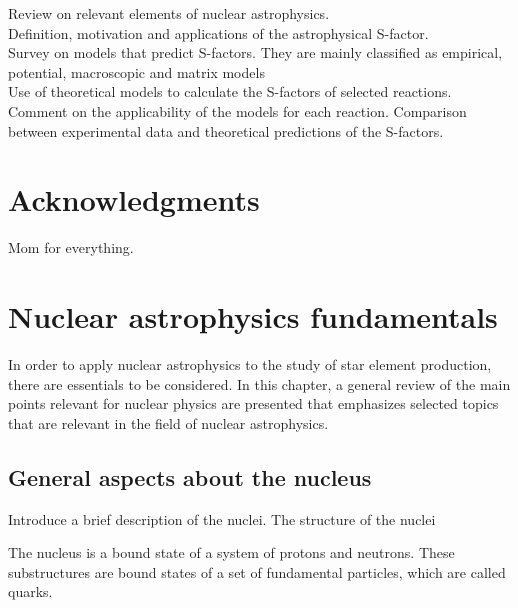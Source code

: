 \documentclass[openany]{book}
\begin{document}
Review on relevant elements of nuclear astrophysics. \\

Definition, motivation and applications of the astrophysical S-factor. \\

Survey on models that predict S-factors. They are mainly classified as empirical, potential, macroscopic and matrix models \\

Use of theoretical models to calculate the S-factors of selected reactions. \\

Comment on the applicability of the models for each reaction. Comparison between experimental data and theoretical predictions of the S-factors.

\clearpage

\chapter*{Acknowledgments}

Mom for everything.

\clearpage

\tableofcontents
\listoffigures
\listoftables



\chapter{Nuclear astrophysics fundamentals}  \label{ch:nuclearAstrophysics}

In order to apply nuclear astrophysics to the study of star element production, there are essentials to be considered. In this chapter, a general review of the main points relevant for nuclear physics are presented that emphasizes selected topics that are relevant in the field of nuclear astrophysics.

\section{General aspects about the nucleus} \label{sec:nucleiAspects}
Introduce a brief description of the nuclei.
\indent The structure of the nuclei

The nucleus is a bound state of a system of protons and neutrons. These substructures are bound states of a set of fundamental particles, which are called quarks.  \\
\end{document}
